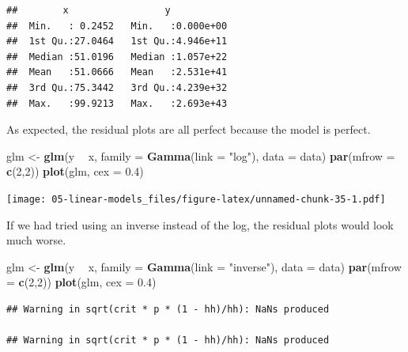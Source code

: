 \documentclass[openany]{book}
\newenvironment{Shaded}{\begin{snugshade}}{\end{snugshade}}
\newcommand{\DataTypeTok}[1]{\textcolor[rgb]{0.13,0.29,0.53}{#1}}
\newcommand{\DecValTok}[1]{\textcolor[rgb]{0.00,0.00,0.81}{#1}}
\newcommand{\FloatTok}[1]{\textcolor[rgb]{0.00,0.00,0.81}{#1}}
\newcommand{\KeywordTok}[1]{\textcolor[rgb]{0.13,0.29,0.53}{\textbf{#1}}}
\newcommand{\NormalTok}[1]{#1}
\newcommand{\OperatorTok}[1]{\textcolor[rgb]{0.81,0.36,0.00}{\textbf{#1}}}
\newcommand{\StringTok}[1]{\textcolor[rgb]{0.31,0.60,0.02}{#1}}
\begin{document}
\begin{verbatim}
##        x                 y            
##  Min.   : 0.2452   Min.   :0.000e+00  
##  1st Qu.:27.0464   1st Qu.:4.946e+11  
##  Median :51.0196   Median :1.057e+22  
##  Mean   :51.0666   Mean   :2.531e+41  
##  3rd Qu.:75.3442   3rd Qu.:4.239e+32  
##  Max.   :99.9213   Max.   :2.693e+43
\end{verbatim}

As expected, the residual plots are all perfect because the model is perfect.

\begin{Shaded}
\begin{Highlighting}[]
\NormalTok{glm <-}\StringTok{ }\KeywordTok{glm}\NormalTok{(y }\OperatorTok{~}\StringTok{ }\NormalTok{x, }\DataTypeTok{family =} \KeywordTok{Gamma}\NormalTok{(}\DataTypeTok{link =} \StringTok{"log"}\NormalTok{), }\DataTypeTok{data =}\NormalTok{ data)}
\KeywordTok{par}\NormalTok{(}\DataTypeTok{mfrow =} \KeywordTok{c}\NormalTok{(}\DecValTok{2}\NormalTok{,}\DecValTok{2}\NormalTok{))}
\KeywordTok{plot}\NormalTok{(glm, }\DataTypeTok{cex =} \FloatTok{0.4}\NormalTok{)}
\end{Highlighting}
\end{Shaded}

\texttt{[image: 05-linear-models\_files/figure-latex/unnamed-chunk-35-1.pdf]}

If we had tried using an inverse instead of the log, the residual plots would look much worse.

\begin{Shaded}
\begin{Highlighting}[]
\NormalTok{glm <-}\StringTok{ }\KeywordTok{glm}\NormalTok{(y }\OperatorTok{~}\StringTok{ }\NormalTok{x, }\DataTypeTok{family =} \KeywordTok{Gamma}\NormalTok{(}\DataTypeTok{link =} \StringTok{"inverse"}\NormalTok{), }\DataTypeTok{data =}\NormalTok{ data)}
\KeywordTok{par}\NormalTok{(}\DataTypeTok{mfrow =} \KeywordTok{c}\NormalTok{(}\DecValTok{2}\NormalTok{,}\DecValTok{2}\NormalTok{))}
\KeywordTok{plot}\NormalTok{(glm, }\DataTypeTok{cex =} \FloatTok{0.4}\NormalTok{)}
\end{Highlighting}
\end{Shaded}

\begin{verbatim}
## Warning in sqrt(crit * p * (1 - hh)/hh): NaNs produced

## Warning in sqrt(crit * p * (1 - hh)/hh): NaNs produced
\end{verbatim}
\end{document}
